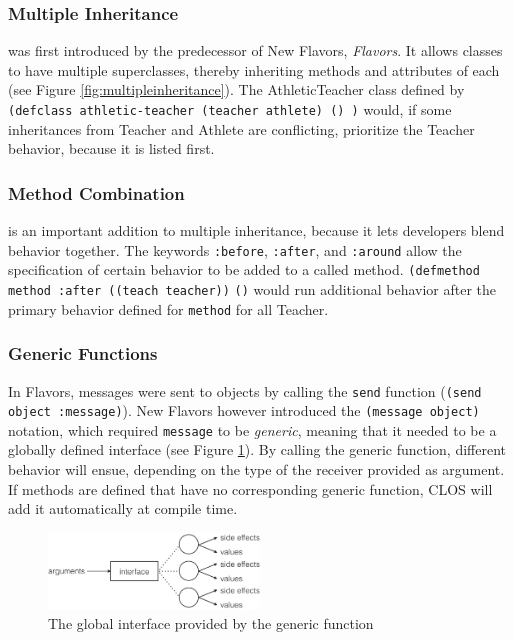 \documentclass[oribibl]{llncs}
\begin{document}
\subsubsection{Multiple Inheritance}
\label{sec:mulinh}
was first introduced by the predecessor of New Flavors, \emph{Flavors}. It allows classes to have multiple superclasses, thereby inheriting methods and attributes of each (see Figure \ref{fig:multipleinheritance}). The AthleticTeacher class defined by \texttt{(defclass athletic-teacher (teacher athlete) () )} would, if some inheritances from Teacher and Athlete are conflicting, prioritize the Teacher behavior, because it is listed first.  


\subsubsection{Method Combination}
\label{sec:metcom}
is an important addition to multiple inheritance, because it lets developers blend behavior together. The keywords \texttt{:before}, \texttt{:after}, and \texttt{:around} allow the specification of certain behavior to be added to a called method. \texttt{(defmethod method :after}\texttt{ ((teach teacher))}
    \texttt{()} would run additional behavior after the primary behavior defined for \texttt{method} for all Teacher. 


\subsubsection{Generic Functions}
\label{sec:genfun}
In Flavors, messages were sent to objects by calling the \texttt{send} function (\texttt{(send object :message)}). New Flavors however introduced the \texttt{(message object)} notation, which required \texttt{message} to be \emph{generic}, meaning that it needed to be a globally defined interface (see Figure \ref{fig:genericfunction}). By calling the generic function, different behavior will ensue, depending on the type of the receiver provided as argument. If methods are defined that have no corresponding generic function, CLOS will add it automatically at compile time.


\begin{figure}[ht]
    \centering
    \includegraphics[width=0.5\textwidth]{images/genericfunction.png}
    \caption{The global interface provided by the generic function}
    \label{fig:genericfunction}
\end{figure}
\end{document}
